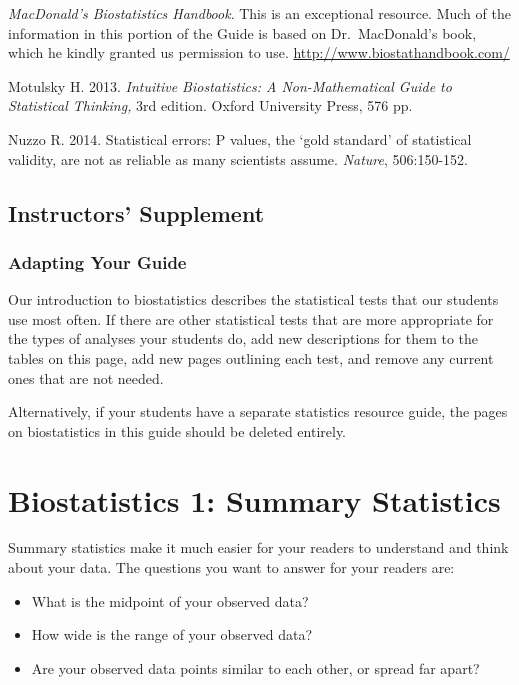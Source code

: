 \documentclass[
]{book}
\providecommand{\tightlist}{%
  \setlength{\itemsep}{0pt}\setlength{\parskip}{0pt}}
\begin{document}
\emph{MacDonald's Biostatistics Handbook}. This is an exceptional resource. Much of the information in this portion of the Guide is based on Dr.~MacDonald's book, which he kindly granted us permission to use. \url{http://www.biostathandbook.com/}

Motulsky H. 2013. \emph{Intuitive Biostatistics: A Non-Mathematical Guide to Statistical Thinking,} 3rd edition. Oxford University Press, 576 pp.~

Nuzzo R. 2014. Statistical errors: P values, the `gold standard' of statistical validity, are not as reliable as many scientists assume. \emph{Nature}, 506:150-152.

\hypertarget{instructors-supplement-5}{%
\section{Instructors' Supplement}\label{instructors-supplement-5}}

\hypertarget{adapting-your-guide-4}{%
\subsection{Adapting Your Guide}\label{adapting-your-guide-4}}

Our introduction to biostatistics describes the statistical tests that our students use most often. If there are other statistical tests that are more appropriate for the types of analyses your students do, add new descriptions for them to the tables on this page, add new pages outlining each test, and remove any current ones that are not needed.

Alternatively, if your students have a separate statistics resource guide, the pages on biostatistics in this guide should be deleted entirely.

\hypertarget{sumstats460}{%
\chapter{Biostatistics 1: Summary Statistics}\label{sumstats460}}

Summary statistics make it much easier for your readers to understand and think about your data. The questions you want to answer for your readers are:

\begin{itemize}
\tightlist
\item
  What is the midpoint of your observed data?
\item
  How wide is the range of your observed data?
\item
  Are your observed data points similar to each other, or spread far apart?
\end{itemize}
\end{document}
